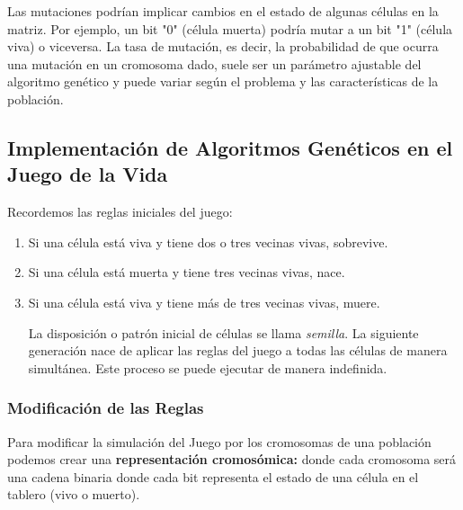 Las mutaciones podrían implicar cambios en el estado de algunas células en la matriz. Por ejemplo, un bit "0" (célula muerta) podría mutar a un bit "1" (célula viva) o viceversa. La tasa de mutación, es decir, la probabilidad de que ocurra una mutación en un cromosoma dado, suele ser un parámetro ajustable del algoritmo genético y puede variar según el problema y las características de la población.


\subsection{Implementación de Algoritmos Genéticos en el Juego de la Vida}

Recordemos las reglas iniciales del juego:
\begin{enumerate}
    \item Si una célula está viva y tiene dos o tres vecinas vivas, sobrevive.
    \item Si una célula está muerta y tiene tres vecinas vivas, nace.
    \item Si una célula está viva y tiene más de tres vecinas vivas, muere.
    
    La disposición o patrón inicial de células se llama \textit{semilla}. La siguiente 
    generación nace de aplicar las reglas del juego a todas las células de manera 
    simultánea. Este proceso se puede ejecutar de manera indefinida.
\end{enumerate}

\subsubsection*{Modificación de las Reglas}

Para modificar la simulación del Juego por los cromosomas de una población podemos crear
una \textbf{representación cromosómica:} donde cada cromosoma será una cadena binaria 
donde cada bit representa el estado de una célula en el tablero (vivo o muerto).\\ 

